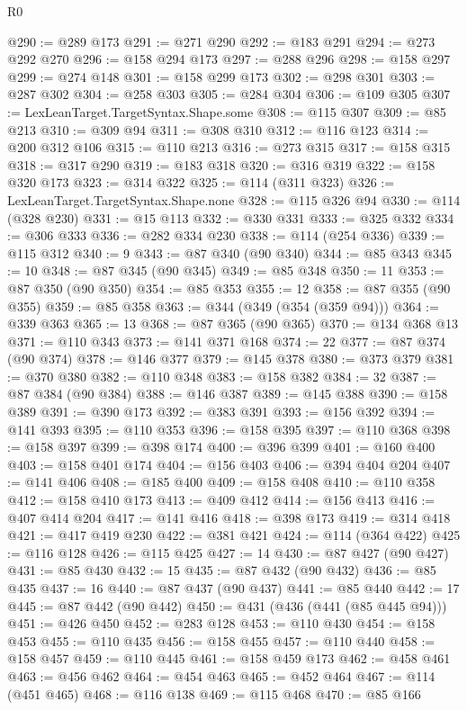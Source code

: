 \begin{lexlean}{R0}
\begin{coremodule}
@290 := @289 @173
@291 := @271 @290
@292 := @183 @291
@294 := @273 @292 @270
@296 := @158 @294 @173
@297 := @288 @296
@298 := @158 @297
@299 := @274 @148
@301 := @158 @299 @173
@302 := @298 @301
@303 := @287 @302
@304 := @258 @303
@305 := @284 @304
@306 := @109 @305
@307 := LexLeanTarget.TargetSyntax.Shape.some
@308 := @115 @307
@309 := @85 @213
@310 := @309 @94
@311 := @308 @310
@312 := @116 @123
@314 := @200 @312 @106
@315 := @110 @213
@316 := @273 @315
@317 := @158 @315
@318 := @317 @290
@319 := @183 @318
@320 := @316 @319
@322 := @158 @320 @173
@323 := @314 @322
@325 := @114 (@311 @323)
@326 := LexLeanTarget.TargetSyntax.Shape.none
@328 := @115 @326 @94
@330 := @114 (@328 @230)
@331 := @15 @113
@332 := @330 @331
@333 := @325 @332
@334 := @306 @333
@336 := @282 @334 @230
@338 := @114 (@254 @336)
@339 := @115 @312
@340 := 9
@343 := @87 @340 (@90 @340)
@344 := @85 @343
@345 := 10
@348 := @87 @345 (@90 @345)
@349 := @85 @348
@350 := 11
@353 := @87 @350 (@90 @350)
@354 := @85 @353
@355 := 12
@358 := @87 @355 (@90 @355)
@359 := @85 @358
@363 := @344 (@349 (@354 (@359 @94)))
@364 := @339 @363
@365 := 13
@368 := @87 @365 (@90 @365)
@370 := @134 @368 @13
@371 := @110 @343
@373 := @141 @371 @168
@374 := 22
@377 := @87 @374 (@90 @374)
@378 := @146 @377
@379 := @145 @378
@380 := @373 @379
@381 := @370 @380
@382 := @110 @348
@383 := @158 @382
@384 := 32
@387 := @87 @384 (@90 @384)
@388 := @146 @387
@389 := @145 @388
@390 := @158 @389
@391 := @390 @173
@392 := @383 @391
@393 := @156 @392
@394 := @141 @393
@395 := @110 @353
@396 := @158 @395
@397 := @110 @368
@398 := @158 @397
@399 := @398 @174
@400 := @396 @399
@401 := @160 @400
@403 := @158 @401 @174
@404 := @156 @403
@406 := @394 @404 @204
@407 := @141 @406
@408 := @185 @400
@409 := @158 @408
@410 := @110 @358
@412 := @158 @410 @173
@413 := @409 @412
@414 := @156 @413
@416 := @407 @414 @204
@417 := @141 @416
@418 := @398 @173
@419 := @314 @418
@421 := @417 @419 @230
@422 := @381 @421
@424 := @114 (@364 @422)
@425 := @116 @128
@426 := @115 @425
@427 := 14
@430 := @87 @427 (@90 @427)
@431 := @85 @430
@432 := 15
@435 := @87 @432 (@90 @432)
@436 := @85 @435
@437 := 16
@440 := @87 @437 (@90 @437)
@441 := @85 @440
@442 := 17
@445 := @87 @442 (@90 @442)
@450 := @431 (@436 (@441 (@85 @445 @94)))
@451 := @426 @450
@452 := @283 @128
@453 := @110 @430
@454 := @158 @453
@455 := @110 @435
@456 := @158 @455
@457 := @110 @440
@458 := @158 @457
@459 := @110 @445
@461 := @158 @459 @173
@462 := @458 @461
@463 := @456 @462
@464 := @454 @463
@465 := @452 @464
@467 := @114 (@451 @465)
@468 := @116 @138
@469 := @115 @468
@470 := @85 @166

\end{coremodule}
\end{lexlean}

